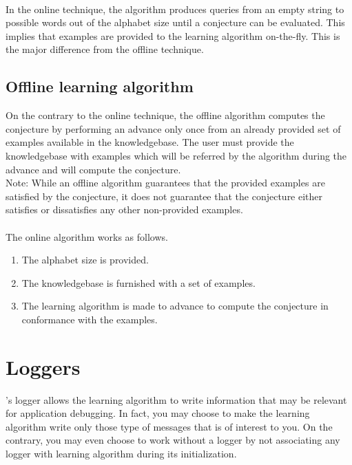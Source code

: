 \paragraph{}
In the online technique, the algorithm produces queries from an empty string to possible words out of the alphabet size until a conjecture can be evaluated. This implies that examples are provided to the learning algorithm on-the-fly. This is the major difference  from the offline technique.


\subsection{Offline learning algorithm}
On the contrary to the online technique, the offline algorithm computes the conjecture by performing an advance only once from an already provided set of examples available in the knowledgebase. The user must provide the knowledgebase with examples which will be referred by the algorithm during the advance and will compute the conjecture. \\
Note: While an offline algorithm guarantees that the provided examples are satisfied by the conjecture, it does not guarantee that the conjecture either satisfies or dissatisfies any other non-provided examples.
\paragraph{}
The online algorithm works as follows.
\begin{enumerate}
 \item The alphabet size is provided.
 \item The knowledgebase is furnished with a set of examples.
 \item The learning algorithm is made to advance to compute the conjecture in conformance with the examples.
\end{enumerate}
\paragraph{}

\section{Loggers}
\libalf's logger allows the learning algorithm to write information that may be relevant for application debugging. In fact, you may choose to make the learning algorithm write only those type of messages that is of interest to you. On the contrary, you may even choose to work without a logger by not associating any logger with learning algorithm during its initialization. 
